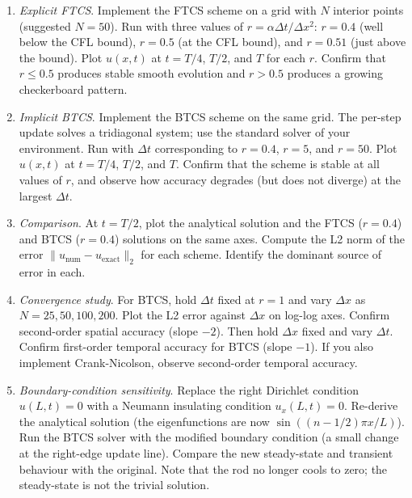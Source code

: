\begin{project}
\begin{enumerate}[leftmargin=*]
  \item \emph{Explicit FTCS}. Implement the FTCS scheme on a grid
    with $N$ interior points (suggested $N = 50$). Run with three
    values of $r = \alpha \Delta t/\Delta x^{2}$: $r = 0.4$
    (well below the CFL bound), $r = 0.5$ (at the CFL bound), and
    $r = 0.51$ (just above the bound). Plot $u(x, t)$ at $t =
    T/4$, $T/2$, and $T$ for each $r$. Confirm that $r \leq 0.5$
    produces stable smooth evolution and $r > 0.5$ produces a
    growing checkerboard pattern.

  \item \emph{Implicit BTCS}. Implement the BTCS scheme on the
    same grid. The per-step update solves a tridiagonal system;
    use the standard solver of your environment. Run with $\Delta
    t$ corresponding to $r = 0.4$, $r = 5$, and $r = 50$. Plot
    $u(x, t)$ at $t = T/4$, $T/2$, and $T$. Confirm that the
    scheme is stable at all values of $r$, and observe how
    accuracy degrades (but does not diverge) at the largest
    $\Delta t$.

  \item \emph{Comparison}. At $t = T/2$, plot the analytical
    solution and the FTCS ($r = 0.4$) and BTCS ($r = 0.4$) solutions
    on the same axes. Compute the L2 norm of the error
    $\|u_{\text{num}} - u_{\text{exact}}\|_{2}$ for each scheme.
    Identify the dominant source of error in each.

  \item \emph{Convergence study}. For BTCS, hold $\Delta t$ fixed
    at $r = 1$ and vary $\Delta x$ as $N = 25, 50, 100, 200$.
    Plot the L2 error against $\Delta x$ on log-log axes. Confirm
    second-order spatial accuracy (slope $-2$). Then hold $\Delta
    x$ fixed and vary $\Delta t$. Confirm first-order temporal
    accuracy for BTCS (slope $-1$). If you also implement
    Crank-Nicolson, observe second-order temporal accuracy.

  \item \emph{Boundary-condition sensitivity}. Replace the right
    Dirichlet condition $u(L, t) = 0$ with a Neumann insulating
    condition $u_{x}(L, t) = 0$. Re-derive the analytical solution
    (the eigenfunctions are now $\sin((n - 1/2)\pi x/L)$). Run
    the BTCS solver with the modified boundary condition (a small
    change at the right-edge update line). Compare the new
    steady-state and transient behaviour with the original. Note
    that the rod no longer cools to zero; the steady-state is
    not the trivial solution.
\end{enumerate}


\end{project}
